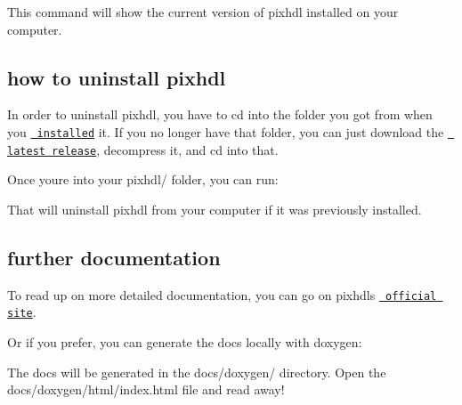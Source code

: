 This command will show the current version of pixhdl installed on your computer.

\subsection*{how to uninstall pixhdl}

In order to uninstall pixhdl, you have to {\ttfamily cd} into the folder you got from when you \href{\#how-to-install-pixhdl}{\texttt{ installed}} it. If you no longer have that folder, you can just download the \href{https://github.com/kokkonisd/pixhdl/releases/latest}{\texttt{ latest release}}, decompress it, and {\ttfamily cd} into that.

Once you\textquotesingle{}re into your {\ttfamily pixhdl/} folder, you can run\+:


\begin{DoxyCode}{0}
\end{DoxyCode}


That will uninstall pixhdl from your computer if it was previously installed.

\subsection*{further documentation}

To read up on more detailed documentation, you can go on pixhdl\textquotesingle{}s \href{https://kokkonisd.github.io/pixhdl/}{\texttt{ official site}}.

Or if you prefer, you can generate the docs locally with {\ttfamily doxygen}\+:


\begin{DoxyCode}{0}
\end{DoxyCode}


The docs will be generated in the {\ttfamily docs/doxygen/} directory. Open the {\ttfamily docs/doxygen/html/index.\+html} file and read away! 